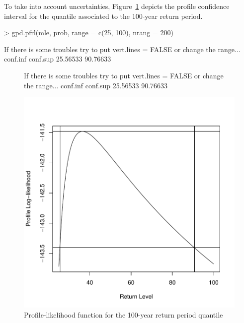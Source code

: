 \documentclass[a4paper]{article}
\numberwithin{equation}{section}
\theoremstyle{definition}
\begin{document}
To take into account uncertainties, Figure~\ref{fig:pfrlArdieres}
depicts the profile confidence interval for the quantile associated to
the 100-year return period.
\begin{Schunk}
\begin{Sinput}
> gpd.pfrl(mle, prob, range = c(25, 100), nrang = 200)
\end{Sinput}
\begin{Soutput}
If there is some troubles try to put vert.lines = FALSE or change
 the range...
conf.inf conf.sup 
25.56533 90.76633 
\end{Soutput}
\end{Schunk}

\begin{figure}
\centering
\begin{Schunk}
\begin{Soutput}
If there is some troubles try to put vert.lines = FALSE or change
 the range...
conf.inf conf.sup 
25.56533 90.76633 
\end{Soutput}
\end{Schunk}
\includegraphics{guide-044}
\caption{Profile-likelihood function for the 100-year return period
  quantile} 
\label{fig:pfrlArdieres}
\end{figure}
\end{document}
